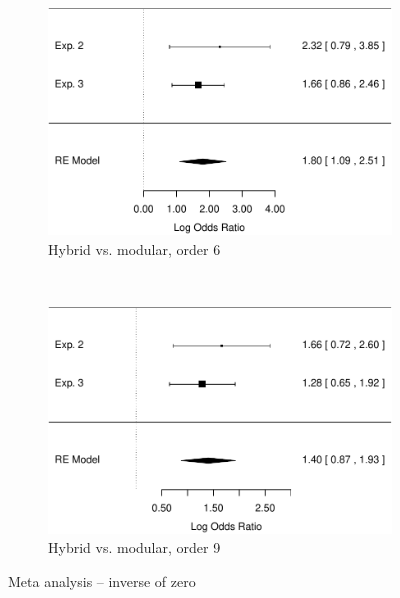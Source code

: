 \documentclass[man,mask,10pt]{apa6}
\begin{document}
\begin{figure}
\begin{subfigure}[c]{0.4\textwidth}
\includegraphics[width=\textwidth]{figures/meta/question_typeinverse_zero_6_conditionhybrid.pdf}
\caption{Hybrid vs. modular, order 6}
\end{subfigure}
~
\begin{subfigure}[c]{0.4\textwidth}
\centering
\includegraphics[width=\textwidth]{figures/meta/question_typeinverse_zero_9_conditionhybrid.pdf}
\caption{Hybrid vs. modular, order 9}
\end{subfigure}
\caption{Meta analysis -- inverse of zero}
\label{meta_inZ}
\end{figure}\noindent 
\end{document}
